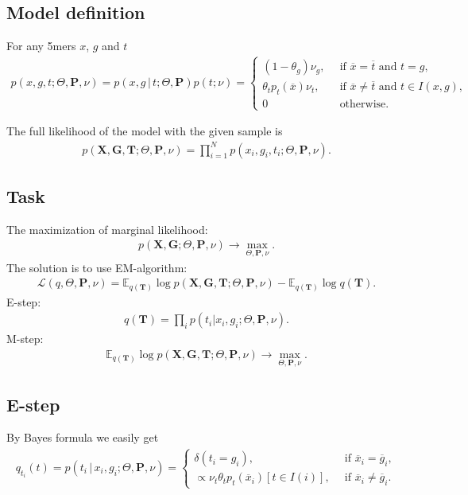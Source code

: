 \documentclass[10pt]{article}
\begin{document}
\subsection{Model definition}
For any 5mers $x$, $g$ and $t$
\begin{gather}
    p(x, g, t; \Theta, \mathbf P, \nu) = p(x, g \,|\, t; \Theta, \mathbf P) p(t; \nu) =
    \begin{cases}
        (1 - \theta_g) \nu_g, \, & \mbox{ if $\overline x = \overline t$ and $t = g$}, \\
        \theta_tp_t(\overline x) \nu_t, \, & \mbox{ if $\overline x \neq \overline t$ and $t \in I(x, g)$},\\
        0 \, & \mbox{ otherwise}.
    \end{cases}
\end{gather}

The full likelihood of the model with the given sample is
\begin{gather}
    p(\mathbf X, \mathbf G, \mathbf T; \Theta, \mathbf P, \nu) = 
    \prod_{i=1}^N p(x_i, g_i, t_i; \Theta, \mathbf P, \nu).
\end{gather}

\subsection{Task}

The maximization of marginal likelihood:
\begin{gather}
    p(\mathbf X, \mathbf G; \Theta, \mathbf P, \nu) \to \max_{\Theta, \mathbf P, \nu}.
\end{gather}
The solution is to use EM-algorithm:
\begin{gather}
    \mathcal L(q, \Theta, \mathbf P, \nu) = 
    \mathbb E_{q(\mathbf T)} \log p(\mathbf X, \mathbf G, \mathbf T; \Theta, \mathbf P, \nu) -
    \mathbb E_{q(\mathbf T)} \log q(\mathbf T).
\end{gather}
E-step:
\begin{gather}
    q(\mathbf T) = \prod_i p(t_i | x_i, g_i; \Theta, \mathbf P, \nu).
\end{gather}
M-step:
\begin{gather}
    \mathbb E_{q(\mathbf T)} \log p(\mathbf X, \mathbf G, \mathbf T; \Theta, \mathbf P, \nu) \to 
    \max_{\Theta, \mathbf P, \nu}.
\end{gather}

\subsection{E-step}
By Bayes formula we easily get
\begin{gather}
    q_{t_i}(t) = p(t_i \, | \, x_i, g_i; \Theta, \mathbf P, \nu) =
    \begin{cases}
        \delta(t_i = g_i), \, & \mbox{ if $\overline x_i = \overline g_i$}, \\
        \propto \nu_t \theta_t p_t(\overline x_i) [t \in I(i)], \, & 
        \mbox{ if $\overline x_i \neq \overline g_i$}.
    \end{cases}
\end{gather}
\end{document}
